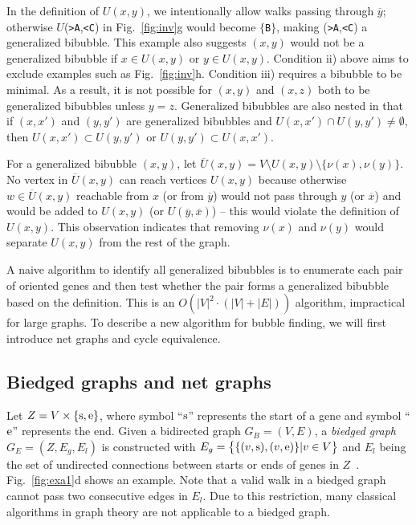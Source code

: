 \documentclass[webpdf,contemporary,large,namedate]{oup-authoring-template}%
\begin{document}
In the definition of $U(x,y)$, we intentionally allow walks passing through $\overline{y}$;
otherwise $U$({\tt >A},{\tt <C}) in Fig.~\ref{fig:inv}g would become $\{${\tt B}$\}$, making ({\tt >A},{\tt <C}) a generalized bibubble.
This example also suggests $(x,y)$ would not be a generalized bibubble if $x\in U(x,y)$ or $y\in U(x,y)$.
Condition ii) above aims to exclude examples such as Fig.~\ref{fig:inv}h.
Condition iii) requires a bibubble to be minimal.
As a result, it is not possible for $(x,y)$ and $(x,z)$ both to be generalized bibubbles unless $y=z$.
Generalized bibubbles are also nested in that
if $(x,x')$ and $(y,y')$ are generalized bibubbles and $U(x,x')\cap U(y,y')\not=\emptyset$,
then $U(x,x')\subset U(y,y')$ or $U(y,y')\subset U(x,x')$.

For a generalized bibubble $(x,y)$, let $\overline{U}(x,y)=V\setminus U(x,y)\setminus\{\nu(x),\nu(y)\}$.
No vertex in $\overline{U}(x,y)$ can reach vertices $U(x,y)$
because otherwise $w\in\overline{U}(x,y)$ reachable from $x$ (or from $\overline{y}$)
would not pass through $y$ (or $\overline{x}$) and would be added to $U(x,y)$ (or $U(\overline{y},\overline{x})$)
-- this would violate the definition of $U(x,y)$.
This observation indicates that removing $\nu(x)$ and $\nu(y)$ would separate $U(x,y)$ from the rest of the graph.

A naive algorithm to identify all generalized bibubbles is to enumerate each pair of oriented genes
and then test whether the pair forms a generalized bibubble based on the definition.
This is an $O(|V|^2\cdot(|V|+|E|))$ algorithm, impractical for large graphs.
To describe a new algorithm for bubble finding, we will first introduce net graphs and cycle equivalence.

\subsection{Biedged graphs and net graphs}

Let $Z=V\times\{{\rm s},{\rm e}\}$, where symbol ``${\rm s}$'' represents the start of a gene
and symbol ``${\rm e}$'' represents the end.
Given a bidirected graph $G_B=(V,E)$, a \emph{biedged graph} $G_E=(Z,E_g,E_l)$ is constructed
with $E_g=\big\{\{(v,{\rm s}),(v,{\rm e})\}|v\in V\big\}$ and $E_l$ being the set of undirected connections between starts or ends of genes in $Z$~\citep{Paten:2018aa}.
Fig.~\ref{fig:exa1}d shows an example.
Note that a valid walk in a biedged graph cannot pass two consecutive edges in $E_l$.
Due to this restriction, many classical algorithms in graph theory are not applicable to a biedged graph.
\end{document}
